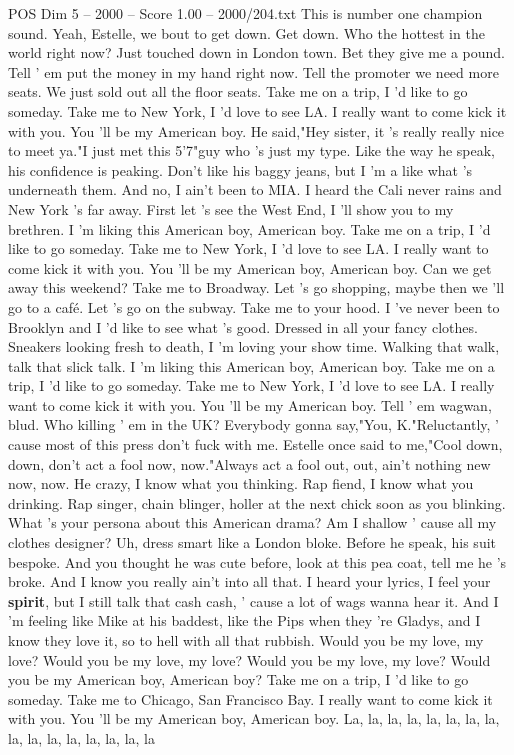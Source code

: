 \begin{textsample}{POS Dim 5 – 2000 – Score 1.00 – 2000/204.txt}  \label{ex:f5_pos_008}
This is number one champion sound.
Yeah, Estelle, we bout to get down.
Get down.
Who the hottest in the world right now?
Just touched down in London town.
Bet they give me a pound.
Tell ' em put the money in my hand right now.
Tell the promoter we need more seats.
We just sold out all the floor seats.
Take me on a trip, I 'd like to go someday.
Take me to New York, I 'd love to see LA.
I really want to come kick it with you.
You 'll be my American boy.
He said,"Hey sister, it 's really really nice to meet ya."I just met this 5'7"guy who 's just my type.
Like the way he speak, his confidence is peaking.
Don't like his baggy jeans, but I 'm a like what 's underneath them.
And no, I ain't been to MIA.
I heard the Cali never rains and New York 's far away.
First let 's see the West End, I 'll show you to my brethren.
I 'm liking this American boy, American boy.
Take me on a trip, I 'd like to go someday.
Take me to New York, I 'd love to see LA.
I really want to come kick it with you.
You 'll be my American boy, American boy.
Can we get away this weekend?
Take me to Broadway.
Let 's go shopping, maybe then we 'll go to a café.
Let 's go on the subway.
Take me to your hood.
I 've never been to Brooklyn and I 'd like to see what 's good.
Dressed in all your fancy clothes.
Sneakers looking fresh to death, I 'm loving your show time.
Walking that walk, talk that slick talk.
I 'm liking this American boy, American boy.
Take me on a trip, I 'd like to go someday.
Take me to New York, I 'd love to see LA.
I really want to come kick it with you.
You 'll be my American boy.
Tell ' em wagwan, blud.
Who killing ' em in the UK?
Everybody gonna say,"You, K."Reluctantly, ' cause most of this press don't fuck with me.
Estelle once said to me,"Cool down, down, don't act a fool now, now."Always act a fool out, out, ain't nothing new now, now.
He crazy, I know what you thinking.
Rap fiend, I know what you drinking.
Rap singer, chain blinger, holler at the next chick soon as you blinking.
What 's your persona about this American drama?
Am I shallow ' cause all my clothes designer?
Uh, dress smart like a London bloke.
Before he speak, his suit bespoke.
And you thought he was cute before, look at this pea coat, tell me he 's broke.
And I know you really ain't into all that.
I heard your lyrics, I feel your \textbf{spirit}, but I still talk that cash cash, ' cause a lot of wags wanna hear it.
And I 'm feeling like Mike at his baddest, like the Pips when they 're Gladys, and I know they love it, so to hell with all that rubbish.
Would you be my love, my love?
Would you be my love, my love?
Would you be my love, my love?
Would you be my American boy, American boy?
Take me on a trip, I 'd like to go someday.
Take me to Chicago, San Francisco Bay.
I really want to come kick it with you.
You 'll be my American boy, American boy.
La, la, la, la, la, la, la, la, la, la, la, la, la, la, la, la

\end{textsample}
